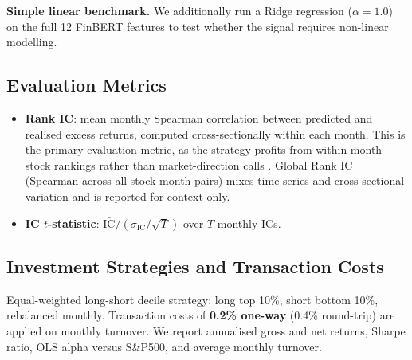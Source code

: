 \textbf{Simple linear benchmark.} We additionally run a Ridge regression ($\alpha=1.0$) on the full 12 FinBERT features to test whether the signal requires non-linear modelling.

\subsection{Evaluation Metrics}

\begin{itemize}[noitemsep]
    \item \textbf{Rank IC}: mean monthly Spearman correlation between predicted and realised excess returns, computed cross-sectionally within each month. This is the primary evaluation metric, as the strategy profits from within-month stock rankings rather than market-direction calls \cite{grinold1999}. Global Rank IC (Spearman across all stock-month pairs) mixes time-series and cross-sectional variation and is reported for context only.
    \item \textbf{IC $t$-statistic}: $\bar{\text{IC}} / (\sigma_\text{IC} / \sqrt{T})$ over $T$ monthly ICs.
\end{itemize}

\subsection{Investment Strategies and Transaction Costs}

Equal-weighted long-short decile strategy: long top 10\%, short bottom 10\%, rebalanced monthly. Transaction costs of \textbf{0.2\% one-way} (0.4\% round-trip) are applied on monthly turnover. We report annualised gross and net returns, Sharpe ratio, OLS alpha versus S\&P500, and average monthly turnover.
